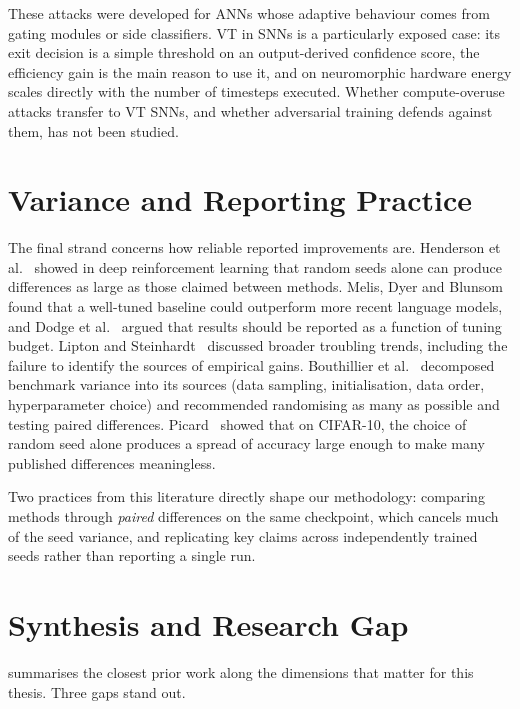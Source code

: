 These attacks were developed for ANNs whose adaptive behaviour comes from gating modules or side classifiers. VT in SNNs is a particularly exposed case: its exit decision is a simple threshold on an output-derived confidence score, the efficiency gain is the main reason to use it, and on neuromorphic hardware energy scales directly with the number of timesteps executed. Whether compute-overuse attacks transfer to VT SNNs, and whether adversarial training defends against them, has not been studied.

\section{Variance and Reporting Practice}
\label{sec:rw-variance}

The final strand concerns how reliable reported improvements are. Henderson et al.~\cite{henderson2018deep} showed in deep reinforcement learning that random seeds alone can produce differences as large as those claimed between methods. Melis, Dyer and Blunsom~\cite{melis2018state} found that a well-tuned baseline could outperform more recent language models, and Dodge et al.~\cite{dodge2019show} argued that results should be reported as a function of tuning budget. Lipton and Steinhardt~\cite{lipton2019troubling} discussed broader troubling trends, including the failure to identify the sources of empirical gains. Bouthillier et al.~\cite{bouthillier2021accounting} decomposed benchmark variance into its sources (data sampling, initialisation, data order, hyperparameter choice) and recommended randomising as many as possible and testing paired differences. Picard~\cite{picard2021torch} showed that on CIFAR-10, the choice of random seed alone produces a spread of accuracy large enough to make many published differences meaningless.

Two practices from this literature directly shape our methodology: comparing methods through \emph{paired} differences on the same checkpoint, which cancels much of the seed variance, and replicating key claims across independently trained seeds rather than reporting a single run.

\section{Synthesis and Research Gap}
\label{sec:rw-synthesis}

 summarises the closest prior work along the dimensions that matter for this thesis. Three gaps stand out.

